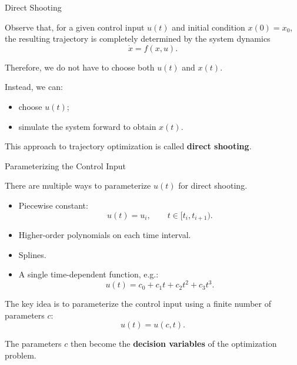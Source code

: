 \documentclass{beamer}
\begin{document}
\begin{frame}{Direct Shooting}
	\begin{flushleft}
		Observe that, for a given control input $u(t)$ and
		initial condition $x(0)=x_0$, the resulting trajectory is completely determined by
		the system dynamics
		\[
		\dot{x}=f(x,u).
		\]
		
		\vspace{0.5em}
		
		Therefore, we do not have to choose both $u(t)$ and $x(t)$.
		
		Instead, we can:
		\begin{itemize}
			\item choose $u(t)$;
			\item simulate the system forward to obtain $x(t)$.
		\end{itemize}
		
		\vspace{0.5em}
		
		This approach to trajectory optimization is called
		\textbf{direct shooting}.
	\end{flushleft}
\end{frame}


\begin{frame}{Parameterizing the Control Input}
	\begin{flushleft}
		There are multiple ways to parameterize $u(t)$ for
		direct shooting.
		
		\begin{itemize}
			\item Piecewise constant:
			\[
			u(t)=u_i,
			\qquad
			t\in[t_i,t_{i+1}).
			\]
			
			\item Higher-order polynomials on each time interval.
			
			\item Splines.
			
			\item A single time-dependent function, e.g.:
			\[
			u(t)=c_0+c_1t+c_2t^2+c_3t^3.
			\]
		\end{itemize}
		
		\vspace{0.5em}
		
		The key idea is to parameterize the control input using
		a finite number of parameters $c$:
		\[
		u(t)=u(c,t).
		\]
		
		The parameters $c$ then become the
		\textbf{decision variables} of the optimization problem.
	\end{flushleft}
\end{frame}
\end{document}
